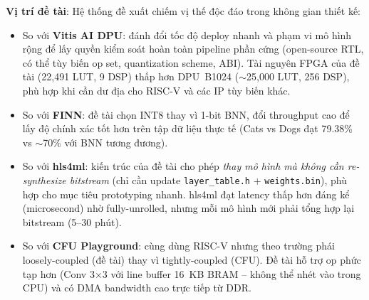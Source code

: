 \begin{table}[H]
    \centering
    \caption{So sánh hệ thống đề xuất với các framework gia tốc CNN trên FPGA.}
    \label{tab:comparison}
\end{table}

\textbf{Vị trí đề tài}: Hệ thống đề xuất chiếm vị thế độc đáo trong không gian thiết kế:
\begin{itemize}
    \item So với \textbf{Vitis AI DPU}: đánh đổi tốc độ deploy nhanh và phạm vi mô hình rộng để lấy quyền kiểm soát hoàn toàn pipeline phần cứng (open-source RTL, có thể tùy biến op set, quantization scheme, ABI). Tài nguyên FPGA của đề tài (22{,}491 LUT, 9 DSP) thấp hơn DPU~B1024 ($\sim$25{,}000 LUT, 256 DSP), phù hợp khi cần dư địa cho RISC-V và các IP tùy biến khác.
    \item So với \textbf{FINN}: đề tài chọn INT8 thay vì 1-bit BNN, đổi throughput cao để lấy độ chính xác tốt hơn trên tập dữ liệu thực tế (Cats vs Dogs đạt 79.38\% vs $\sim$70\% với BNN tương đương).
    \item So với \textbf{hls4ml}: kiến trúc của đề tài cho phép \textit{thay mô hình mà không cần re-synthesize bitstream} (chỉ cần update \texttt{layer\_table.h} + \texttt{weights.bin}), phù hợp cho mục tiêu prototyping nhanh. hls4ml đạt latency thấp hơn đáng kể (microsecond) nhờ fully-unrolled, nhưng mỗi mô hình mới phải tổng hợp lại bitstream (5--30 phút).
    \item So với \textbf{CFU Playground}: cùng dùng RISC-V nhưng theo trường phái loosely-coupled (đề tài) thay vì tightly-coupled (CFU). Đề tài hỗ trợ op phức tạp hơn (Conv 3$\times$3 với line buffer 16~KB BRAM -- không thể nhét vào trong CPU) và có DMA bandwidth cao trực tiếp từ DDR.
\end{itemize}


